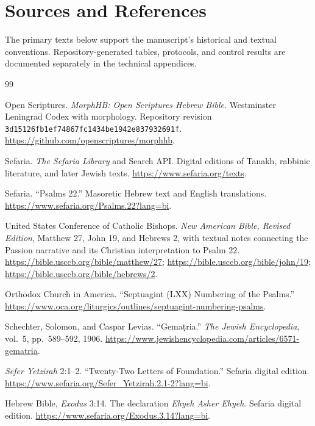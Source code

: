 \section*{Sources and References}

The primary texts below support the manuscript's historical and textual conventions. Repository-generated tables, protocols, and control results are documented separately in the technical appendices.

\begin{thebibliography}{99}

Open Scriptures.
\textit{MorphHB: Open Scriptures Hebrew Bible}.
Westminster Leningrad Codex with morphology.
Repository revision \texttt{3d15126fb1ef74867fc1434be1942e837932691f}.
\url{https://github.com/openscriptures/morphhb}.

Sefaria.
\textit{The Sefaria Library} and Search API.
Digital editions of Tanakh, rabbinic literature, and later Jewish texts.
\url{https://www.sefaria.org/texts}.

Sefaria.
``Psalms 22.''
Masoretic Hebrew text and English translations.
\url{https://www.sefaria.org/Psalms.22?lang=bi}.

United States Conference of Catholic Bishops.
\textit{New American Bible, Revised Edition}, Matthew 27, John 19, and Hebrews 2, with textual notes connecting the Passion narrative and its Christian interpretation to Psalm 22.
\url{https://bible.usccb.org/bible/matthew/27};
\url{https://bible.usccb.org/bible/john/19};
\url{https://bible.usccb.org/bible/hebrews/2}.

Orthodox Church in America.
``Septuagint (LXX) Numbering of the Psalms.''
\url{https://www.oca.org/liturgics/outlines/septuagint-numbering-psalms}.

Schechter, Solomon, and Caspar Levias.
``Gema\d{t}ria.''
\textit{The Jewish Encyclopedia}, vol.~5, pp.~589--592, 1906.
\url{https://www.jewishencyclopedia.com/articles/6571-gematria}.

\textit{Sefer Yetzirah} 2:1--2.
``Twenty-Two Letters of Foundation.''
Sefaria digital edition.
\url{https://www.sefaria.org/Sefer_Yetzirah.2.1-2?lang=bi}.

Hebrew Bible, \textit{Exodus} 3:14.
The declaration \textit{Ehyeh Asher Ehyeh}.
Sefaria digital edition.
\url{https://www.sefaria.org/Exodus.3.14?lang=bi}.


\end{thebibliography}
